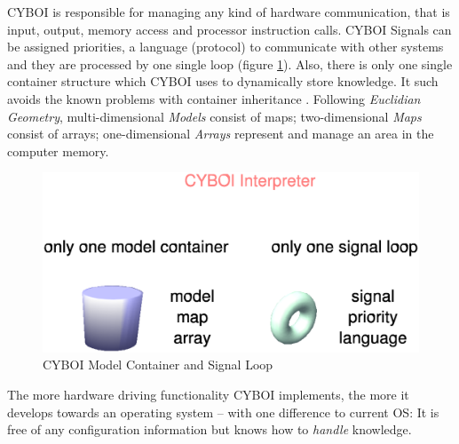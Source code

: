 CYBOI is responsible for managing any kind of hardware communication, that is
input, output, memory access and processor instruction calls. CYBOI Signals can
be assigned priorities, a language (protocol) to communicate with other systems
and they are processed by one single loop (figure \ref{cyboi_figure}). Also,
there is only one single container structure which CYBOI uses to dynamically
store knowledge. It such avoids the known problems with container inheritance
\cite{javaiaq}. Following \emph{Euclidian Geometry}, multi-dimensional
\emph{Models} consist of maps; two-dimensional \emph{Maps} consist of arrays;
one-dimensional \emph{Arrays} represent and manage an area in the computer memory.

\begin{figure}[ht]
    \begin{center}
        \includegraphics[scale=0.3]{vector/cyboi.eps}
        \caption{CYBOI Model Container and Signal Loop}
        \label{cyboi_figure}
    \end{center}
\end{figure}

The more hardware driving functionality CYBOI implements, the more it develops
towards an operating system -- with one difference to current OS: It is free of
any configuration information but knows how to \emph{handle} knowledge.
